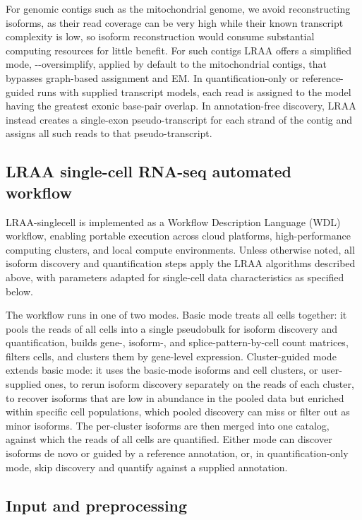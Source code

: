 For genomic contigs such as the mitochondrial genome, we avoid reconstructing isoforms, as their read coverage can be very high while their known transcript complexity is low, so isoform reconstruction would consume substantial computing resources for little benefit. For such contigs LRAA offers a simplified mode, -\/-oversimplify, applied by default to the mitochondrial contigs, that bypasses graph-based assignment and EM. In quantification-only or reference-guided runs with supplied transcript models, each read is assigned to the model having the greatest exonic base-pair overlap. In annotation-free discovery, LRAA instead creates a single-exon pseudo-transcript for each strand of the contig and assigns all such reads to that pseudo-transcript.

\subsection{LRAA single-cell RNA-seq automated workflow}\label{lraa-single-cell-rna-seq-automated-workflow}

LRAA-singlecell is implemented as a Workflow Description Language (WDL) workflow, enabling portable execution across cloud platforms, high-performance computing clusters, and local compute environments. Unless otherwise noted, all isoform discovery and quantification steps apply the LRAA algorithms described above, with parameters adapted for single-cell data characteristics as specified below.

The workflow runs in one of two modes. Basic mode treats all cells together: it pools the reads of all cells into a single pseudobulk for isoform discovery and quantification, builds gene-, isoform-, and splice-pattern-by-cell count matrices, filters cells, and clusters them by gene-level expression. Cluster-guided mode extends basic mode: it uses the basic-mode isoforms and cell clusters, or user-supplied ones, to rerun isoform discovery separately on the reads of each cluster, to recover isoforms that are low in abundance in the pooled data but enriched within specific cell populations, which pooled discovery can miss or filter out as minor isoforms. The per-cluster isoforms are then merged into one catalog, against which the reads of all cells are quantified. Either mode can discover isoforms de novo or guided by a reference annotation, or, in quantification-only mode, skip discovery and quantify against a supplied annotation.

\subsection{Input and preprocessing}\label{input-and-preprocessing-1}

